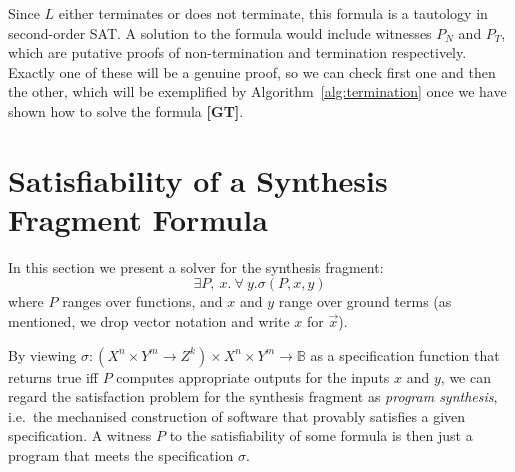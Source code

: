 \documentclass[a4paper]{llncs}
\begin{document}
Since $L$ either terminates or does not terminate, this formula is a tautology in second-order SAT.
A solution to the formula would include witnesses $P_N$ and $P_T$, which are putative proofs of non-termination
and termination respectively.  Exactly one of these will be a genuine proof, so we can check
first one and then the other, which will be exemplified by Algorithm~\ref{alg:termination} once
we have shown how to solve the formula {\bf [GT]}.


% 
% 



\section{Satisfiability of a Synthesis Fragment Formula} \label{sec:synthesis}

In this section we present a solver for the synthesis fragment:
%
\[
  \exists P,~ x . ~\forall~ y . \sigma(P, x, y)
\]
%
where $P$ ranges over functions, and $x$ and $y$ range over ground terms
(as mentioned, we drop vector notation and write $x$ for $\vec{x}$).

By viewing $\sigma: (X^n \times Y^m \to Z^k) \times X^n \times Y^m  \to
\mathbb{B}$ as a specification function that returns true iff $P$ computes
appropriate outputs for the inputs $x$ and $y$, we can regard the
satisfaction problem for the synthesis fragment as \emph{program synthesis},
i.e.~the mechanised construction of software that provably satisfies a
given specification.  A witness $P$ to the satisfiability of some
formula is then just a program that meets the specification $\sigma$.
\end{document}
